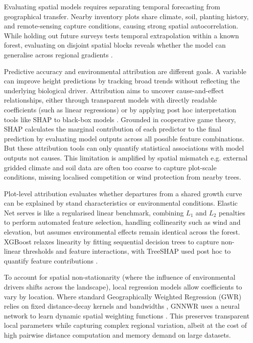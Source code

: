 \documentclass[logo,msc,ai]{infthesis}           %
\begin{document}
Evaluating spatial models requires separating temporal forecasting from geographical transfer. Nearby inventory plots share climate, soil, planting history, and remote-sensing capture conditions, causing strong spatial autocorrelation. While holding out future surveys tests temporal extrapolation within a known forest, evaluating on disjoint spatial blocks reveals whether the model can generalise across regional gradients \cite{ploton2020Spatial_C5_EVAL}.

Predictive accuracy and environmental attribution are different goals. A variable can improve height predictions by tracking broad trends without reflecting the underlying biological driver. Attribution aims to uncover cause-and-effect relationships, either through transparent models with directly readable coefficients (such as linear regressions) or by applying post hoc interpretation tools like SHAP to black-box models \cite{lundberg2017Unified_C7_XAI}. Grounded in cooperative game theory, SHAP calculates the marginal contribution of each predictor to the final prediction by evaluating model outputs across all possible feature combinations. But these attribution tools can only quantify statistical associations with model outputs not causes. This limitation is amplified by spatial mismatch e.g. external gridded climate and soil data are often too coarse to capture plot-scale conditions, missing localised competition or wind protection from nearby trees. 

Plot-level attribution evaluates whether departures from a shared growth curve can be explained by stand characteristics or environmental conditions. Elastic Net serves is like a regularised linear benchmark, combining $L_1$ and $L_2$ penalties to perform automated feature selection, handling collinearity such as wind and elevation, but assumes environmental effects remain identical across the forest. 
XGBoost relaxes linearity by fitting sequential decision trees to capture non-linear thresholds and feature interactions, with TreeSHAP used post hoc to quantify feature contributions \cite{lundberg2017Unified_C7_XAI}.

To account for spatial non-stationarity (where the influence of environmental drivers shifts across the landscape), local regression models allow coefficients to vary by location. Where standard Geographically Weighted Regression (GWR) relies on fixed distance-decay kernels and bandwidths \cite{brunsdon1996Geographically_C6_GWR}, GNNWR uses a neural network to learn dynamic spatial weighting functions \cite{du2020Geographically_C6_GWR}. This preserves transparent local parameters while capturing complex regional variation, albeit at the cost of high pairwise distance computation and memory demand on large datasets.
\end{document}
